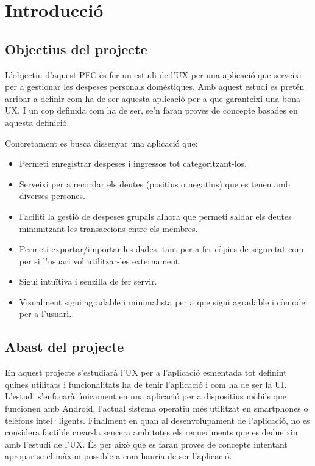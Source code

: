 \chapter{Introducció}

\section{Objectius del projecte}
L'objectiu d'aquest \ac{PFC} és fer un estudi de l'\ac{UX} per una aplicació que serveixi per a gestionar les despeses personals domèstiques. Amb aquest estudi es pretén arribar a definir com ha de ser aquesta aplicació per a que garanteixi una bona \ac{UX}. I un cop definida com ha de ser, se'n faran proves de concepte basades en aquesta definició. 

Concretament es busca dissenyar una aplicació que:
\begin{itemize}
\item Permeti enregistrar despeses i ingressos tot categoritzant-los.
\item Serveixi per a recordar els deutes (positius o negatius) que es tenen amb diverses persones.
\item Faciliti la gestió de despeses grupals alhora que permeti saldar els deutes minimitzant les transaccions entre els membres.
\item Permeti exportar/importar les dades, tant per a fer còpies de seguretat com per si l'usuari vol utilitzar-les externament.
\item Sigui intuïtiva i senzilla de fer servir.
\item Visualment sigui agradable i minimalista per a que sigui agradable i còmode per a l'usuari.
\end{itemize}

\section{Abast del projecte}
En aquest projecte s'estudiarà l'\ac{UX} per a l'aplicació esmentada tot definint quines utilitats i funcionalitats ha de tenir l'aplicació i com ha de ser la \ac{UI}. L'estudi s'enfocarà únicament en una aplicació per a dispositius mòbils que funcionen amb \gls{Android}, l'actual sistema operatiu més utilitzat\cite{Android_OS} en \glspl{smartphone} o telèfons intel·ligents. 
Finalment en quan al desenvolupament de l'aplicació, no es considera factible crear-la sencera amb totes els requeriments que es dedueixin amb l'estudi de l'\ac{UX}. És per això que es faran proves de concepte intentant apropar-se el màxim possible a com hauria de ser l'aplicació. 